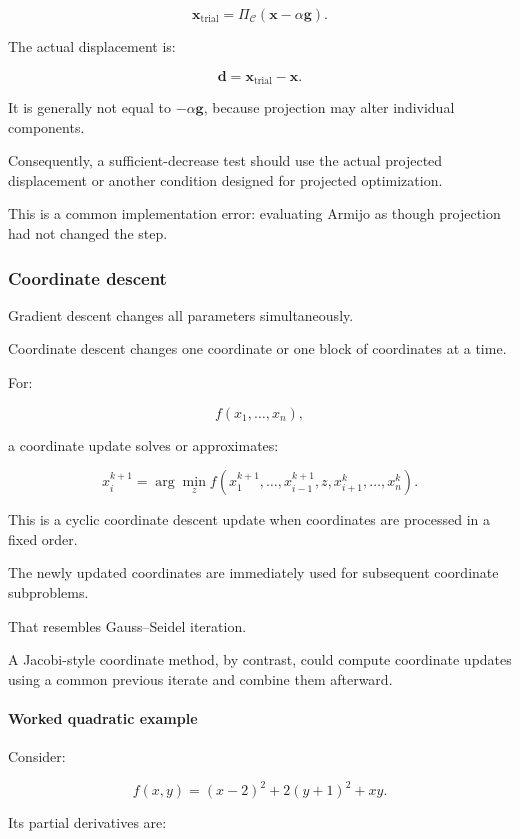 \[
\mathbf x_{\mathrm{trial}} = \Pi_{\mathcal C} (\mathbf x-\alpha\mathbf g).
\]

The actual displacement is:

\[
\mathbf d= \mathbf x_{\mathrm{trial}}-\mathbf x.
\]

It is generally not equal to \(-\alpha\mathbf g\), because projection may alter individual components.

Consequently, a sufficient-decrease test should use the actual projected displacement or another condition designed for projected optimization.

This is a common implementation error: evaluating Armijo as though projection had not changed the step.

\subsubsection{Coordinate descent}\label{02-foundations-ii-ch027-coordinate-descent}

Gradient descent changes all parameters simultaneously.

Coordinate descent changes one coordinate or one block of coordinates at a time.

For:

\[
f(x_1,\ldots,x_n),
\]

a coordinate update solves or approximates:

\[
\boxed{ x_i^{k+1} = \arg\min_z f(x_1^{k+1},\ldots,x_{i-1}^{k+1}, z,x_{i+1}^{k},\ldots,x_n^k) }.
\]

This is a cyclic coordinate descent update when coordinates are processed in a fixed order.

The newly updated coordinates are immediately used for subsequent coordinate subproblems.

That resembles Gauss--Seidel iteration.

A Jacobi-style coordinate method, by contrast, could compute coordinate updates using a common previous iterate and combine them afterward.

\paragraph{Worked quadratic example}\label{02-foundations-ii-ch027-worked-quadratic-example}

Consider:

\[
f(x,y)= (x-2)^2+2(y+1)^2+xy.
\]

Its partial derivatives are:

